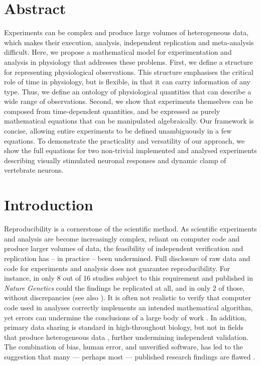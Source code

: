 
\section*{Abstract}

Experiments can be complex and produce large volumes of heterogeneous
data, which makes their execution, analysis, independent replication
and meta-analysis difficult. Here, we propose a mathematical model for
experimentation and analysis in physiology that addresses these
problems. First, we define a structure for representing physiological
observations. This structure emphasises the critical role of time in
physiology, but is flexible, in that it can carry information of any
type. Thus, we define an ontology of physiological quantities that can
describe a wide range of observations. Second, we show that
experiments themselves can be composed from time-dependent quantities,
and be expressed as purely mathematical equations that can be
manipulated algebraically. Our framework is concise, allowing entire
experiments to be defined unambiguously in a few equations. To
demonstrate the practicality and versatility of our approach, we show
the full equations for two non-trivial implemented and analysed
experiments describing visually stimulated neuronal responses and
dynamic clamp of vertebrate neurons. 

\pagebreak

\section*{Introduction}

Reproducibility is a cornerstone of the scientific method. As
scientific experiments and analysis are become increasingly complex,
reliant on computer code and produce larger volumes of data, the
feasibility of independent verification and replication has -- in
practice -- been undermined. Full disclosure of raw data and code for
experiments and analysis does not guarantee reproducibility.  For
instance, in only 8 out of 16 studies subject to this requirement and
published in \emph{Nature Genetics} could the findings be replicated
at all, and in only 2 of those, without discrepancies
\cite{Ioannidis2008} (see also \cite{Baggerly2009,
  McCullough2007}). It is often not realistic to verify that computer
code used in analyses correctly implements an intended mathematical
algorithm, yet errors can undermine the conclusions of a
large body of work \cite{Chang2006}.  In addition, primary data
sharing is standard in high-throughout biology, but
not in fields that produce heterogeneous data \cite{Gardner2005},
further undermining independent validation.  The combination
of bias, human error, and unverified software, has led to the
suggestion that many --- perhaps most --- published research findings
are flawed \cite{Ioannidis2005, Merali2010}.

